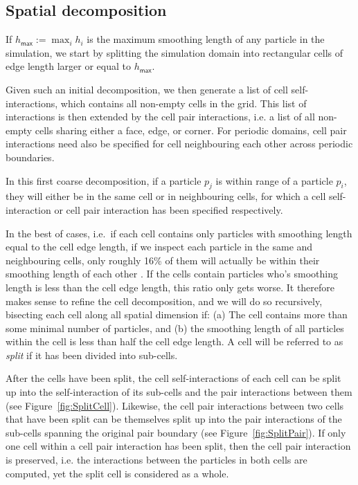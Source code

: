 \documentclass[final]{siamltex}
\newcommand{\fig}[1]
    {Figure~\ref{fig:#1}}
\begin{document}
\subsection{Spatial decomposition}

If $h_\mathsf{max} := \max_i  h_i $ is the maximum smoothing
length of any particle in the simulation, we start by splitting
the simulation domain into rectangular cells of edge length
larger or equal to $h_\mathsf{max}$.

Given such an initial decomposition, we then generate
a list of cell self-interactions, which contains all
non-empty cells in the grid.
This list of interactions is then extended by the cell
pair interactions, i.e. a list of all non-empty cells
sharing either a face, edge, or corner.
For periodic domains, cell pair interactions need also be
specified for cell neighbouring each other across
periodic boundaries.

In this first coarse decomposition, if a particle $p_j$
is within range of a particle $p_i$, they will either be
in the same cell or in neighbouring cells, for which a
cell self-interaction or cell pair interaction has been
specified respectively.

In the best of cases, i.e.~if each cell contains
only particles with smoothing length equal to the cell
edge length, if we inspect each particle in the same
and neighbouring cells, only roughly 16\% of them
will actually be within their smoothing length of each
other \cite{ref:Gonnet2007}.
If the cells contain particles who's smoothing length
is less than the cell edge length, this ratio only
gets worse.
It therefore makes sense to refine the cell decomposition,
and we will do so recursively, bisecting each cell along
all spatial dimension if: (a) The cell contains more than
some minimal number of particles, and (b) the smoothing
length of all particles within the cell is less than half
the cell edge length.
A cell will be referred to as {\em split} if it
has been divided into sub-cells.

After the cells have been split, the cell self-interactions
of each cell can be split up into the self-interaction
of its sub-cells and the pair interactions between
them (see \fig{SplitCell}).
Likewise, the cell pair interactions between two cells
that have been split can be themselves split up into
the pair interactions of the sub-cells spanning the
original pair boundary (see \fig{SplitPair}).
If only one cell within a cell pair interaction has been
split, then the cell pair interaction is preserved, i.e. the
interactions between the particles in both cells are computed,
yet the split cell is considered as a whole.
\end{document}
